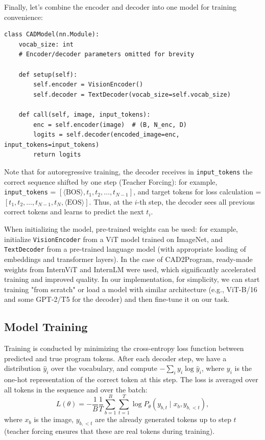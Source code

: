 \documentclass{article}
\begin{document}
Finally, let's combine the encoder and decoder into one model for training convenience:

\begin{lstlisting}
class CADModel(nn.Module):
    vocab_size: int
    # Encoder/decoder parameters omitted for brevity
    
    def setup(self):
        self.encoder = VisionEncoder()
        self.decoder = TextDecoder(vocab_size=self.vocab_size)
    
    def call(self, image, input_tokens):
        enc = self.encoder(image)  # (B, N_enc, D)
        logits = self.decoder(encoded_image=enc, input_tokens=input_tokens)
        return logits
\end{lstlisting}

Note that for autoregressive training, the decoder receives in \texttt{input_tokens} the correct sequence shifted by one step (Teacher Forcing): for example, \texttt{input_tokens} = $[\langle \text{BOS}\rangle, t_1, t_2, \dots, t_{N-1}]$, and target tokens for loss calculation = $[t_1, t_2, \dots, t_{N-1}, t_N, \langle \text{EOS}\rangle]$. Thus, at the $i$-th step, the decoder sees all previous correct tokens and learns to predict the next $t_i$.

When initializing the model, pre-trained weights can be used: for example, initialize \texttt{VisionEncoder} from a ViT model trained on ImageNet, and \texttt{TextDecoder} from a pre-trained language model (with appropriate loading of embeddings and transformer layers). In the case of CAD2Program, ready-made weights from InternViT and InternLM were used, which significantly accelerated training and improved quality. In our implementation, for simplicity, we can start training "from scratch" or load a model with similar architecture (e.g., ViT-B/16 and some GPT-2/T5 for the decoder) and then fine-tune it on our task.

\subsection{Model Training}

Training is conducted by minimizing the cross-entropy loss function between predicted and true program tokens. After each decoder step, we have a distribution $\hat{y}_i$ over the vocabulary, and compute $-\sum_i y_{i}\log \hat{y}_i$, where $y_i$ is the one-hot representation of the correct token at this step. The loss is averaged over all tokens in the sequence and over the batch:
$$L(\theta) = - \frac{1}{B}\frac{1}{T}\sum_{b=1}^B \sum_{t=1}^{T} \log P_\theta(y_{b,t} \mid x_b, y_{b,<t}),$$
where $x_b$ is the image, $y_{b,<t}$ are the already generated tokens up to step $t$ (teacher forcing ensures that these are real tokens during training).
\end{document}
